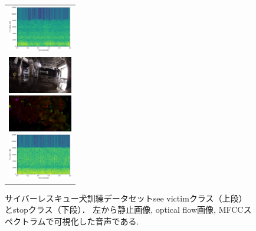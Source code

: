 \documentclass[MIRU,submit]{miru2019j}
\begin{document}
\begin{figure}[tb]
\begin{tabular}{l}
      \begin{minipage}{0.32\hsize}
        \begin{center}
          \includegraphics[clip, width=2.8cm]{./Figures/sound_seevictim.eps}
        \end{center}
      \end{minipage}
\\  %
      \begin{minipage}{0.32\hsize}
        \begin{center}
          \includegraphics[clip, width=2.8cm]{./Figures/still_stop2-3.eps}
        \end{center}
      \end{minipage}
      \begin{minipage}{0.32\hsize}
        \begin{center}
          \includegraphics[clip, width=2.8cm]{./Figures/optic_stop2-3.eps}
        \end{center}
      \end{minipage}
      \begin{minipage}{0.32\hsize}
        \begin{center}
          \includegraphics[clip, width=2.8cm]{./Figures/sound_stop2.eps}
        \end{center}
      \end{minipage}
    \end{tabular}
    \caption{サイバーレスキュー犬訓練データセットsee victimクラス（上段）とstopクラス（下段）． 左から静止画像, optical flow画像, MFCCスペクトラムで可視化した音声である.}
    \label{dataset}
\end{figure}
\end{document}
